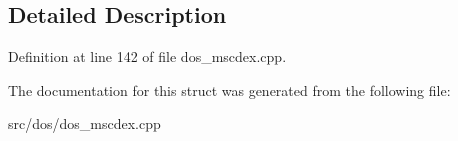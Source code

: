 \subsection{Detailed Description}


Definition at line 142 of file dos\-\_\-mscdex.\-cpp.



The documentation for this struct was generated from the following file\-:\begin{DoxyCompactItemize}
\item 
src/dos/dos\-\_\-mscdex.\-cpp\end{DoxyCompactItemize}
